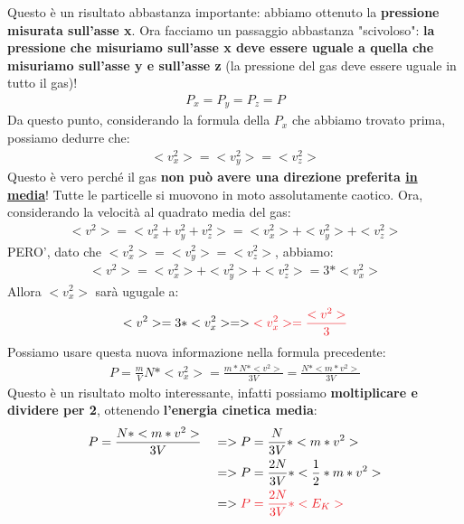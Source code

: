                     Questo è un risultato abbastanza importante: abbiamo ottenuto la \textbf{pressione misurata sull'asse x}. Ora facciamo un passaggio abbastanza "scivoloso": \textbf{la pressione che misuriamo sull'asse x deve essere uguale a quella che misuriamo sull'asse y e sull'asse z} (la pressione del gas deve essere uguale in tutto il gas)!
                    \begin{align*}
                        P_x=P_y=P_z=P
                    \end{align*}
                    Da questo punto, considerando la formula della $P_x$ che abbiamo trovato prima, possiamo dedurre che:
                    \begin{align*}
                        <v_x^2>=<v_y^2>=<v_z^2>
                    \end{align*}
                    Questo è vero perché il gas \textbf{non può avere una direzione preferita \underline{in media}}! Tutte le particelle si muovono in moto assolutamente caotico. Ora, considerando la velocità al quadrato media del gas:
                    \begin{align*}
                        <v^2>=<v_x^2+v_y^2+v_z^2>=<v_x^2>+<v_y^2>+<v_z^2>
                    \end{align*}
                    PERO', dato che $<v_x^2>=<v_y^2>=<v_z^2>$, abbiamo:
                    \begin{align*}
                        <v^2>=<v_x^2>+<v_y^2>+<v_z^2>=3*<v_x^2>
                    \end{align*}
                    Allora $<v_x^2>$ sarà ugugale a:
                    \begin{align*}
                        <v^2>=3*<v_x^2>=>\textcolor{Red}{<v_x^2>=\frac{<v^2>}{3}}
                    \end{align*}
                    Possiamo usare questa nuova informazione nella formula precedente:
                    \begin{align*}
                        P=\frac{m}{V}N*<v_{x}^2>=\frac{m*N*<v^2>}{3V}=\frac{N*<m*v^2>}{3V}
                    \end{align*}
                    Questo è un risultato molto interessante, infatti possiamo \textbf{moltiplicare e dividere per 2}, ottenendo \textbf{l'energia cinetica media}:
                    \begin{align*}
                        &P=\frac{N*<m*v^2>}{3V}&&=>P=\frac{N}{3V}*<m*v^2>\\
                        & &&=>P=\frac{2N}{3V}*<\frac{1}{2}*m*v^2>\\
                        & &&=>\textcolor{Red}{P=\frac{2N}{3V}*<E_K>}
                    \end{align*}
